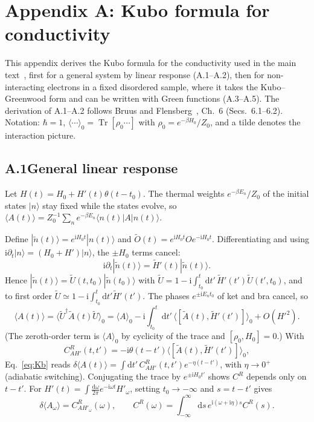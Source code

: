 \providecommand{\ii}{\mathrm{i}}
\providecommand{\dd}{\mathrm{d}}
\providecommand{\avg}[1]{\langle #1 \rangle}
\providecommand{\Tr}{\operatorname{Tr}}
\newpage
\section*{Appendix A: Kubo formula for conductivity}\label{app:kubo}

\noindent This appendix derives the Kubo formula for the conductivity used in the main text~\cite{Kubo1957}, first for a general system by linear response (A.1--A.2), then for non-interacting electrons in a fixed disordered sample, where it takes the Kubo--Greenwood form and can be written with Green functions (A.3--A.5). The derivation of A.1--A.2 follows Bruus and Flensberg~\cite{BruusFlensberg}, Ch.~6 (Secs.~6.1--6.2). Notation: $\hbar=1$, $\avg{\cdots}_0=\Tr[\rho_0\cdots]$ with $\rho_0=e^{-\beta H_0}/Z_0$, and a tilde denotes the interaction picture.

\subsection*{A.1\quad General linear response}
Let $H(t)=H_0+H'(t)\theta(t-t_0)$. The thermal weights $e^{-\beta E_n}/Z_0$ of the initial states $|n\rangle$ stay fixed while the states evolve, so $\avg{A(t)}=Z_0^{-1}\sum_n e^{-\beta E_n}\langle n(t)|A|n(t)\rangle$.

Define $|\tilde n(t)\rangle=e^{\ii H_0t}|n(t)\rangle$ and $\tilde O(t)=e^{\ii H_0t}Oe^{-\ii H_0t}$. Differentiating and using $\ii\partial_t|n\rangle=(H_0+H')|n\rangle$, the $\pm H_0$ terms cancel:
\begin{equation}
\ii\partial_t|\tilde n(t)\rangle=\tilde H'(t)|\tilde n(t)\rangle .
\end{equation}
Hence $|\tilde n(t)\rangle=\tilde U(t,t_0)|\tilde n(t_0)\rangle$ with $\tilde U=1-\ii\int_{t_0}^t\dd t'\,\tilde H'(t')\tilde U(t',t_0)$, and to first order $\tilde U\simeq1-\ii\int_{t_0}^t\dd t'\tilde H'(t')$. The phases $e^{\pm\ii E_nt_0}$ of ket and bra cancel, so
\begin{equation}
\avg{A(t)}=\big\langle\tilde U^\dagger\tilde A(t)\tilde U\big\rangle_0
=\avg{A}_0-\ii\int_{t_0}^{t}\dd t'\,\avg{[\tilde A(t),\tilde H'(t')]}_0+O(H'^2).
\label{eq:Kb}
\end{equation}
(The zeroth-order term is $\avg{A}_0$ by cyclicity of the trace and $[\rho_0,H_0]=0$.) With
\begin{equation}
C^R_{AH'}(t,t')=-\ii\theta(t-t')\avg{[\tilde A(t),\tilde H'(t')]}_0 ,
\end{equation}
Eq.~\eqref{eq:Kb} reads $\delta\avg{A(t)}=\int\dd t'\,C^R_{AH'}(t,t')e^{-\eta(t-t')}$, with $\eta\to0^+$ (adiabatic switching). Conjugating the trace by $e^{\pm\ii H_0t'}$ shows $C^R$ depends only on $t-t'$. For $H'(t)=\int\frac{\dd\omega}{2\pi}e^{-\ii\omega t}H'_\omega$, setting $t_0\to-\infty$ and $s=t-t'$ gives
\begin{equation}
\delta\avg{A_\omega}=C^R_{AH'_\omega}(\omega),\qquad
C^R(\omega)=\int_{-\infty}^{\infty}\dd s\,e^{\ii(\omega+\ii\eta)s}C^R(s).
\end{equation}

